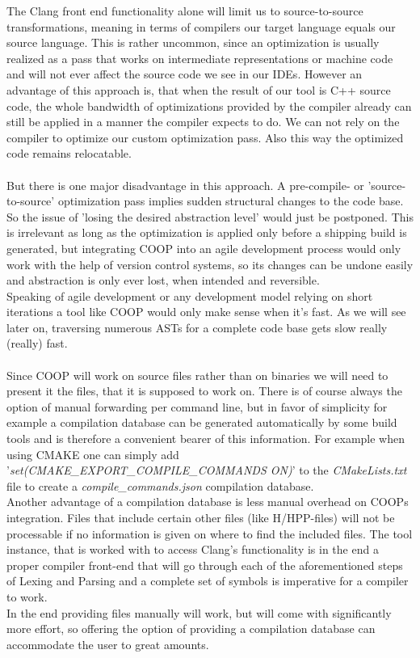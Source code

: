 The Clang front end functionality alone will limit us to source-to-source transformations, meaning in terms of compilers our target language equals our source language. This is rather uncommon, since an optimization is usually realized as a pass that works on intermediate representations or machine code and will not ever affect the source code we see in our IDEs. However an advantage of this approach is, that when the result of our tool is C++ source code, the whole bandwidth of optimizations provided by the compiler already can still be applied in a manner the compiler expects to do. We can not rely on the compiler to optimize our custom optimization pass. Also this way the optimized code remains relocatable.\\\\
But there is one major disadvantage in this approach. A pre-compile- or 'source-to-source' optimization pass implies sudden structural changes to the code base. So the issue of 'losing the desired abstraction level' would just be postponed. This is irrelevant as long as the optimization is applied only before a shipping build is generated, but integrating COOP into an agile development process would only work with the help of version control systems, so its changes can be undone easily and abstraction is only ever lost, when intended and reversible.\\
Speaking of agile development or any development model relying on short iterations a tool like COOP would only make sense when it's fast. As we will see later on, traversing numerous ASTs for a complete code base gets slow really (really) fast.\\\\
Since COOP will work on source files rather than on binaries we will need to present it the files, that it is supposed to work on. There is of course always the option of manual forwarding per command line, but in favor of simplicity for example a compilation database can be generated automatically by some build tools and is therefore a convenient bearer of this information. For example when using CMAKE one can simply add '\textit{set(CMAKE\_EXPORT\_COMPILE\_COMMANDS ON)}' to the \textit{CMakeLists.txt} file to create a \textit{compile\_commands.json} compilation database.\\
Another advantage of a compilation database is less manual overhead on COOPs integration. Files that include certain other files (like H/HPP-files) will not be processable if no information is given on where to find the included files. The tool instance, that is worked with to access Clang's functionality is in the end a proper compiler front-end that will go through each of the aforementioned steps of Lexing and Parsing and a complete set of symbols is imperative for a compiler to work.\\
In the end providing files manually will work, but will come with significantly more effort, so offering the option of providing a compilation database can accommodate the user to great amounts.

